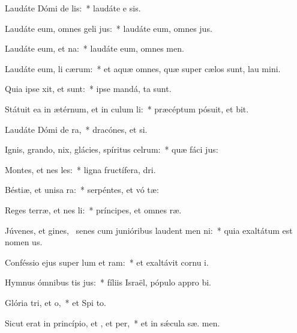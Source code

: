 \item Laudáte Dómi de lis:~* laudáte e  sis.
\item Laudáte eum, omnes geli jus:~* laudáte eum, omnes  jus.
\item Laudáte eum,  et na:~* laudáte eum, omnes   men.
\item Laudáte eum, li cærum:~* et aquæ omnes, quæ super cælos sunt, lau  mini.
\item Quia ipse xit, et  sunt:~* ipse mandá,  ta sunt.
\item Státuit ea in ætérnum, et in culum li:~* præcéptum pósuit, et  bit.
\item Laudáte Dómi de ra,~* dracónes, et  si.
\item Ignis, grando, nix, glácies, spíritus celrum:~* quæ fáci  jus:
\item Montes, et nes les:~* ligna fructífera,   dri.
\item Béstiæ, et unisa ra:~* serpéntes, et vó tæ:
\item Reges terræ, et nes li:~* príncipes, et omnes  ræ.
\item Júvenes, et gines,~\pscross{} senes cum junióribus laudent men ni:~* quia exaltátum est nomen  us.
\item Conféssio ejus super lum et ram:~* et exaltávit cornu  i.
\item Hymnus ómnibus tis jus:~* fíliis Israël, pópulo appro bi.
\item Glória tri, et o,~* et Spi to.
\item Sicut erat in princípio, et , et per,~* et in sǽcula sæ. men.
